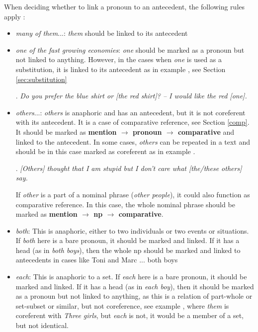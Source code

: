 \documentclass[a4paper]{article}
\begin{document}
{{When deciding whether to link a pronoun to an antecedent, the following rules apply \cite[p. 9]{GuillouEtAlGuide}:
\begin{itemize}
\item  {\sl many of them}...: {\sl them} should be linked to its antecedent
\item {\sl one of the fast growing economies}: {\sl one} should be marked as a
pronoun but not linked to anything. However, in the cases when \textsl{one} is used as a substitution, it is linked to its antecedent as in example \Next, see Section \ref{sec:substitution}

\ex.
{\sl Do you prefer the blue shirt or [the red shirt]? -- I would like the red [one].}

\item {\sl others}...: {\sl others} is anaphoric and has an antecedent, but it is not coreferent with its antecedent. It is a case of comparative reference, see Section \ref{comp}. It should be marked as {\bf mention $\rightarrow$ pronoun $\rightarrow$ comparative} and linked to the antecedent. %
In some cases, {\sl others} can be repeated in a text and should be in this case marked as coreferent as in example \Next.

\ex. {\sl [Others] thought that I am stupid but I don't care what [the/these others] say.}

If {\sl other} is a part of a nominal phrase ({\sl other people}), it could also function as comparative reference. In this case, the whole nominal phrase should be marked as {\bf mention $\rightarrow$ np $\rightarrow$ comparative}.

\item {\sl both}: This is anaphoric, either to two individuals or two events or situations. If {\sl both} here is a bare pronoun, it should be marked and linked. If
it has a head (as in {\sl both boys}), then the whole np should be marked and linked to antecedents in cases like {Toni and Marc ... both boys}%

\item {\sl each}: This is anaphoric to a set. If {\sl each} here is a bare pronoun, it should be marked and linked. If it has a head (as in {\sl each boy}), then it should be marked as a pronoun but not linked to anything, as this is a relation of part-whole or set-subset or similar, but not coreference, see example \Next, where {\sl them} is coreferent with {\sl Three girls}, but {\sl each} is not, it would be a member of a set, but not identical.


\end{itemize}}}
\end{document}
